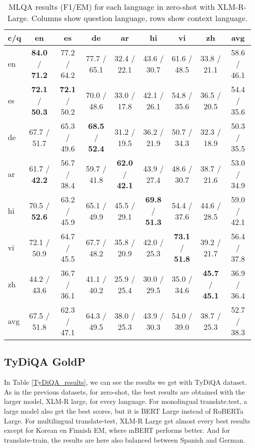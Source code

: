 \documentclass[11pt]{article}
\begin{document}
\begin{table*}[ht]
    \centering
    \begin{adjustbox}{max width=\textwidth}
    \begin{tabular}{l|ccccccc|c}
    \toprule
        c/q & en & es & de & ar & hi & vi & zh & avg \\ \midrule
        en & \textbf{84.0} / \textbf{71.2} & 77.2 / 64.2 & 77.7 / 65.1 & 32.4 / 22.1 & 43.6 / 30.7 & 61.6 / 48.5 & 33.8 / 21.1 & 58.6 / 46.1 \\ 
        es & \textbf{72.1} / \textbf{50.3} & \textbf{72.1} / 50.2 & 70.0 / 48.6 & 33.0 / 17.8 & 42.1 / 26.1 & 54.8 / 35.6 & 36.5 / 20.5 & 54.4 / 35.6 \\ 
        de & 67.7 / 51.7 & 65.3 / 49.6 & \textbf{68.5} / \textbf{52.4} & 31.2 / 19.5 & 36.2 / 21.9 & 50.7 / 34.3 & 32.3 / 18.9 & 50.3 / 35.5 \\ 
        ar & 61.7 / \textbf{42.2} & 56.7 / 38.4 & 59.7 / 41.8 & \textbf{62.0} / \textbf{42.1} & 43.9 / 27.4 & 48.6 / 30.7 & 38.7 / 21.6 & 53.0 / 34.9 \\ 
        hi & 70.5 / \textbf{52.6} & 63.2 / 45.9 & 65.1 / 49.9 & 45.5 / 29.1 & \textbf{69.8} / \textbf{51.3} & 54.4 / 37.6 & 44.6 / 28.5 & 59.0 / 42.1 \\ 
        vi & 72.1 / 50.9 & 64.7 / 45.5 & 67.7 / 48.2 & 35.8 / 20.9 & 42.0 / 25.3 & \textbf{73.1} / \textbf{51.8} & 39.2 / 21.7 & 56.4 / 37.8 \\ 
        zh & 44.2 / 43.6 & 36.7 / 36.1 & 41.1 / 40.2 & 25.9 / 25.4 & 30.0 / 29.5 & 35.0 / 34.6 & \textbf{45.7} / \textbf{45.1} & 36.9 / 36.4 \\ \midrule
        avg & 67.5 / 51.8 & 62.3 / 47.1 & 64.3 / 49.5 & 38.0 / 25.3 & 43.9 / 30.3 & 54.0 / 39.0 & 38.7 / 25.3 & 52.7 / 38.3 \\ \bottomrule
    \end{tabular}
    \end{adjustbox}
    \caption{MLQA results (F1/EM) for each language in zero-shot with XLM-R-Large. Columns show question language, rows show context language.}
    \label{MLQA_results_ZS_XLM-R-Large}
\end{table*}

\subsection{TyDiQA GoldP}

In Table \ref{TyDiQA_results}, we can see the results we get with TyDiQA dataset. As in the previous datasets, for zero-shot, the best results are obtained with the larger model, XLM-R large, for every language. For monolingual translate.test, a large model also get the best scores, but it is BERT Large instead of RoBERTa Large. For multilingual translate-test, XLM-R Large get almost every best results except for Korean en Finnish EM, where mBERT performs better. And for translate-train, the results are here also balanced between Spanish and German.
\end{document}
